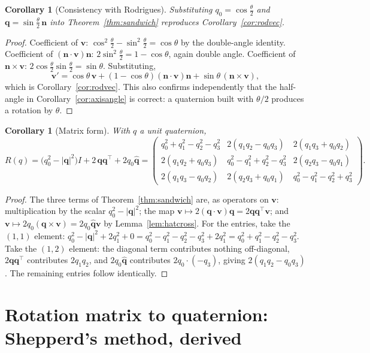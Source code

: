 \documentclass[11pt]{article}
\newcommand{\vv}[1]{\bm{#1}}
\newcommand{\hatmap}[1]{\widehat{#1}}
\newcommand{\halfth}{\tfrac{\theta}{2}}
\theoremstyle{plain}
\newtheorem{corollary}[theorem]{Corollary}
\theoremstyle{definition}
\begin{document}
\begin{corollary}[Consistency with Rodrigues]
Substituting $q_0=\cos\halfth$ and $\vv q=\sin\halfth\,\vv n$ into Theorem~\ref{thm:sandwich}
reproduces Corollary~\ref{cor:rodvec}.
\end{corollary}

\begin{proof}
Coefficient of $\vv v$: $\cos^2\halfth-\sin^2\halfth=\cos\theta$ by the double-angle identity.
Coefficient of $(\vv n\cdot\vv v)\vv n$: $2\sin^2\halfth=1-\cos\theta$, again double angle.
Coefficient of $\vv n\times\vv v$: $2\cos\halfth\sin\halfth=\sin\theta$. Substituting,
\[
\vv v'=\cos\theta\,\vv v+(1-\cos\theta)(\vv n\cdot\vv v)\vv n+\sin\theta\,(\vv n\times\vv v),
\]
which is Corollary~\ref{cor:rodvec}. This also confirms independently that the half-angle in
Corollary~\ref{cor:axisangle} is correct: a quaternion built with $\theta/2$ produces a rotation
by $\theta$.
\end{proof}

\begin{corollary}[Matrix form]\label{cor:Rofq}
With $q$ a unit quaternion,
\[
R(q)=\big(q_0^2-|\vv q|^2\big)I+2\,\vv q\vv q^{\!\top}+2q_0\hatmap{\vv q}
=\begin{pmatrix}
q_0^2+q_1^2-q_2^2-q_3^2 & 2(q_1q_2-q_0q_3) & 2(q_1q_3+q_0q_2)\\[2pt]
2(q_1q_2+q_0q_3) & q_0^2-q_1^2+q_2^2-q_3^2 & 2(q_2q_3-q_0q_1)\\[2pt]
2(q_1q_3-q_0q_2) & 2(q_2q_3+q_0q_1) & q_0^2-q_1^2-q_2^2+q_3^2
\end{pmatrix}.
\]
\end{corollary}

\begin{proof}
The three terms of Theorem~\ref{thm:sandwich} are, as operators on $\vv v$: multiplication by the
scalar $q_0^2-|\vv q|^2$; the map $\vv v\mapsto2(\vv q\cdot\vv v)\vv q=2\vv q\vv q^{\!\top}\vv v$;
and $\vv v\mapsto2q_0(\vv q\times\vv v)=2q_0\hatmap{\vv q}\vv v$ by Lemma~\ref{lem:hatcross}. For
the entries, take the $(1,1)$ element: $q_0^2-|\vv q|^2+2q_1^2+0
=q_0^2-q_1^2-q_2^2-q_3^2+2q_1^2=q_0^2+q_1^2-q_2^2-q_3^2$. Take the $(1,2)$ element:
the diagonal term contributes nothing off-diagonal, $2\vv q\vv q^{\!\top}$ contributes $2q_1q_2$,
and $2q_0\hatmap{\vv q}$ contributes $2q_0\cdot(-q_3)$, giving $2(q_1q_2-q_0q_3)$. The remaining
entries follow identically.
\end{proof}

\section{Rotation matrix to quaternion: Shepperd's method, derived}
\end{document}

